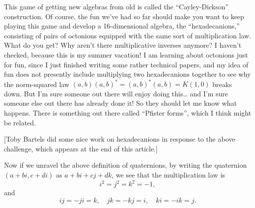 \documentclass{article}
\begin{document}
This game of getting new algebras from old is called the
``Cayley-Dickson'' construction. Of course, the fun we've had so far
should make you want to keep playing this game and develop a
16-dimensional algebra, the ``hexadecanions,'' consisting of pairs of
octonions equipped with the same sort of multiplication law. What do you
get? Why aren't there multiplicative inverses anymore? I haven't
checked, because this is my summer vacation! I am learning about
octonions just for fun, since I just finished writing some rather
technical papers, and my idea of fun does not presently include
multiplying two hexadecanions together to see why the norm-squared law
\((a,b) (a,b)^* = (a,b)^* (a,b) = K (1,0)\) breaks down. But I'm sure
someone out there will enjoy doing this\ldots{} and I'm sure someone
else out there has already done it! So they should let me know what
happens. There is something out there called ``Pfister forms'', which I
think might be related.

{[}Toby Bartels did some nice work on hexadecanions in response to the
above challenge, which appears at the end of this article.{]}

Now if we unravel the above definition of quaternions, by writing the
quaternion \((a+bi,c+di)\) as \(a+bi+cj+dk\), we see that the
multiplication law is \[i^2 = j^2 = k^2 = -1,\] and
\[ij = -ji = k, \quad jk = -kj = i, \quad ki = -ik = j.\]
\end{document}
